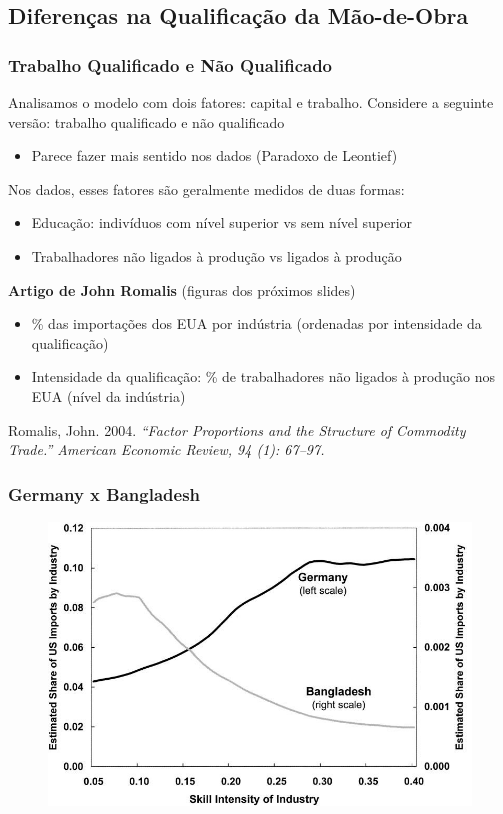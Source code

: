 \documentclass[a4paper,12pt]{article}[abntex2]
\begin{document}
\subsection{\textbf{Diferenças na Qualificação da Mão-de-Obra}}
\subsubsection{\textbf{Trabalho Qualificado e Não Qualificado}}
Analisamos o modelo com dois fatores: capital e trabalho. Considere a seguinte versão: trabalho qualificado e não qualificado
\begin{itemize}
    \item Parece fazer mais sentido nos dados (Paradoxo de Leontief)
\end{itemize}

Nos dados, esses fatores são geralmente medidos de duas formas:
\begin{itemize}
    \item Educação: indivíduos com nível superior vs sem nível superior
    \item Trabalhadores não ligados à produção vs ligados à produção
\end{itemize}

\textbf{Artigo de John Romalis} (figuras dos próximos slides)
\begin{itemize}
    \item \% das importações dos EUA por indústria (ordenadas por intensidade da qualificação)
    \item Intensidade da qualificação: \% de trabalhadores não ligados à produção nos EUA (nível da indústria)
\end{itemize}

Romalis, John. 2004. \textit{“Factor Proportions and the Structure of Commodity Trade.” American Economic Review, 94 (1): 67–97.}

\subsubsection{Germany x Bangladesh}
\begin{figure}[H]
    \centering
    \includegraphics[width=0.7\linewidth]{Imagens/a13i3.png}
\end{figure}
\end{document}
